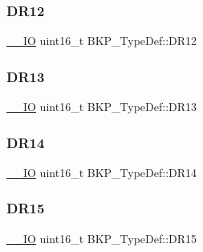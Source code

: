 \mbox{\label{struct_b_k_p___type_def_ab41da40ac09242ce3e9779e1634048be}} 
\subsubsection{\texorpdfstring{DR12}{DR12}}
{\footnotesize\ttfamily \mbox{\hyperlink{group___c_m_s_i_s___c_m3__core__definitions_gaec43007d9998a0a0e01faede4133d6be}{\+\_\+\+\_\+\+IO}} uint16\+\_\+t B\+K\+P\+\_\+\+Type\+Def\+::\+D\+R12}

\mbox{\label{struct_b_k_p___type_def_a0ab16642a837425a410058ce4295b208}} 
\subsubsection{\texorpdfstring{DR13}{DR13}}
{\footnotesize\ttfamily \mbox{\hyperlink{group___c_m_s_i_s___c_m3__core__definitions_gaec43007d9998a0a0e01faede4133d6be}{\+\_\+\+\_\+\+IO}} uint16\+\_\+t B\+K\+P\+\_\+\+Type\+Def\+::\+D\+R13}

\mbox{\label{struct_b_k_p___type_def_aa925753417b767820db2ff1fa87d0c86}} 
\subsubsection{\texorpdfstring{DR14}{DR14}}
{\footnotesize\ttfamily \mbox{\hyperlink{group___c_m_s_i_s___c_m3__core__definitions_gaec43007d9998a0a0e01faede4133d6be}{\+\_\+\+\_\+\+IO}} uint16\+\_\+t B\+K\+P\+\_\+\+Type\+Def\+::\+D\+R14}

\mbox{\label{struct_b_k_p___type_def_accafac1f65c5eb8f63d5a98ee8173ab3}} 
\subsubsection{\texorpdfstring{DR15}{DR15}}
{\footnotesize\ttfamily \mbox{\hyperlink{group___c_m_s_i_s___c_m3__core__definitions_gaec43007d9998a0a0e01faede4133d6be}{\+\_\+\+\_\+\+IO}} uint16\+\_\+t B\+K\+P\+\_\+\+Type\+Def\+::\+D\+R15}

